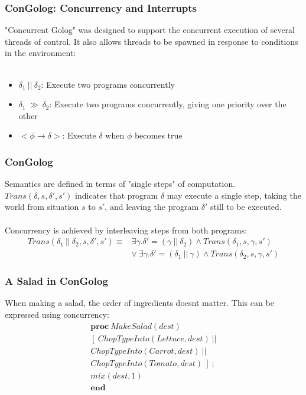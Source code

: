 \documentclass{beamer}
\begin{document}
\begin{frame}
\frametitle{ConGolog: Concurrency and Interrupts}
"Concurrent Golog" was designed to support the concurrent execution of
several threads of control.  It also allows threads to be spawned in
response to conditions in the environment: \\
\ \\
\begin{itemize}
  \pause
  \item $\delta_1\ ||\ \delta_2$: Execute two programs concurrently
  \pause
  \item $\delta_1\ \gg\ \delta_2$: Execute two programs concurrently, giving one priority over the other
  \pause
  \item $<\phi \rightarrow \delta>$: Execute $\delta$ when $\phi$ becomes true
\end{itemize}
\end{frame}

\begin{frame}
\frametitle{ConGolog}
Semantics are defined in terms of "single steps" of computation.
$Trans(\delta,s,\delta',s')$ indicates that program $\delta$ may execute
a single step, taking the world from situation $s$ to $s'$, and leaving the
program $\delta'$ still to be executed.\\
\ \\
\pause
Concurrency is achieved by interleaving steps from both programs:
\[
\begin{array}{cc}
Trans(\delta_1\ ||\ \delta_2,s,\delta',s') \equiv & \exists \gamma . \delta'=(\gamma\ ||\ \delta_2)\wedge Trans(\delta_1,s,\gamma,s')\\
& \vee\ \exists \gamma . \delta'=(\delta_1\ ||\ \gamma)\wedge Trans(\delta_2,s,\gamma,s')
\end{array}\]
\end{frame}

\begin{frame}
\frametitle{A Salad in ConGolog}
When making a salad, the order of ingredients doesnt matter.  This can
be expressed using concurrency:\[
\begin{array}{c}
\mathbf{proc}\ MakeSalad(dest)\\
\left[\ ChopTypeInto(Lettuce,dest)\ ||\right.\\
ChopTypeInto(Carrot,dest)\ ||\\
\left.ChopTypeInto(Tomato,dest)\ \right]\ ;\\
mix(dest,1)\\
\mathbf{end}\end{array}\]
\end{frame}
\end{document}
